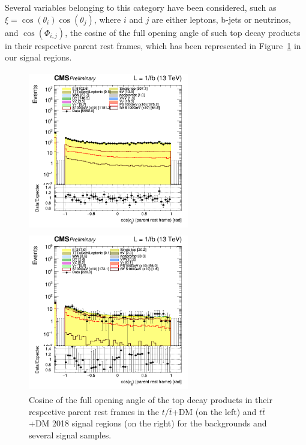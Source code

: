 \documentclass[a4paper, 10pt, openright]{report}
\begin{document}
Several variables belonging to this category have been considered, such as $\xi = \cos(\theta_i) \cos(\theta_j)$, where $i$ and $j$ are either leptons, b-jets or neutrinos, and $\cos(\Phi_{i,j})$, the cosine of the full opening angle of such top decay products in their respective parent rest frames, which has been represented in Figure~\ref{fig:SRdisc3} in our signal regions.

\begin{figure}[htbp]
\centering
\begin{minipage}[b]{.48\textwidth}
\includegraphics[width=7cm, height=7cm]{figs/log_cratio_topCR_ll_2j_signal1_cosphill.png}
\end{minipage}\hfill
\begin{minipage}[b]{.48\textwidth}
\includegraphics[width=7cm, height=7cm]{figs/log_cratio_topCR_ll_2j_signal0_cosphill.png}
\end{minipage} \hfill
\caption{Cosine of the full opening angle of the top decay products in their respective parent rest frames in the $t/ \bar t$+DM (on the left) and $t \bar t$+DM 2018 signal regions (on the right) for the backgrounds and several signal samples.}
\label{fig:SRdisc3}
\end{figure}
\end{document}
